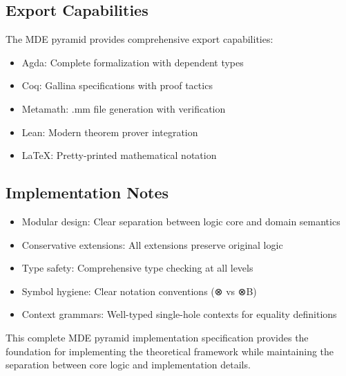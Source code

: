 \subsection{Export Capabilities}

The MDE pyramid provides comprehensive export capabilities:

\begin{itemize}
\item Agda: Complete formalization with dependent types
\item Coq: Gallina specifications with proof tactics
\item Metamath: .mm file generation with verification
\item Lean: Modern theorem prover integration
\item LaTeX: Pretty-printed mathematical notation
\end{itemize}

\subsection{Implementation Notes}

\begin{itemize}
\item Modular design: Clear separation between logic core and domain semantics
\item Conservative extensions: All extensions preserve original logic
\item Type safety: Comprehensive type checking at all levels
\item Symbol hygiene: Clear notation conventions (⊗ vs ⊗B)
\item Context grammars: Well-typed single-hole contexts for equality definitions
\end{itemize}

This complete MDE pyramid implementation specification provides the foundation for implementing the theoretical framework while maintaining the separation between core logic and implementation details.
